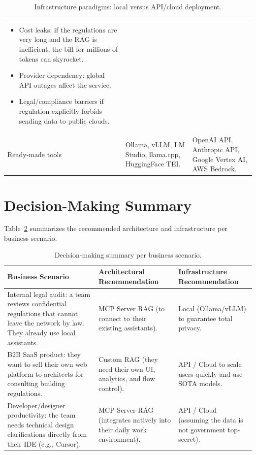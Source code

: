 \documentclass[11pt,a4paper]{article}
\begin{document}
\begin{table}[htbp]
\begin{tabular}{>{\raggedright\arraybackslash}p{2.0cm}>{\raggedright\arraybackslash}p{6.4cm}>{\raggedright\arraybackslash}p{6.4cm}}
\begin{itemize}[leftmargin=1.2em, nosep, topsep=0pt]
  \item Cost leaks: if the regulations are very long and the RAG is inefficient, the bill for millions of tokens can skyrocket.
  \item Provider dependency: global API outages affect the service.
  \item Legal/compliance barriers if regulation explicitly forbids sending data to public clouds.
\end{itemize} \\
Ready-made tools & Ollama, vLLM, LM Studio, llama.cpp, HuggingFace TEI. & OpenAI API, Anthropic API, Google Vertex AI, AWS Bedrock. \\
\bottomrule
\end{tabular}
\endgroup
\caption{Infrastructure paradigms: local versus API/cloud deployment.}
\label{tab:infra}
\end{table}

\section{Decision-Making Summary}
\label{sec:decision}

Table~\ref{tab:decision} summarizes the recommended architecture and
infrastructure per business scenario.

\begin{table}[htbp]
\centering
\begingroup
\footnotesize
\setlength{\tabcolsep}{4pt}
\begin{tabular}{>{\raggedright\arraybackslash}p{4.8cm}>{\raggedright\arraybackslash}p{4.8cm}>{\raggedright\arraybackslash}p{4.8cm}}
\toprule
\textbf{Business Scenario} & \textbf{Architectural Recommendation} & \textbf{Infrastructure Recommendation} \\
\midrule
Internal legal audit: a team reviews confidential regulations that cannot leave the network by law. They already use local assistants. & MCP Server RAG (to connect to their existing assistants). & Local (Ollama/vLLM) to guarantee total privacy. \\
B2B SaaS product: they want to sell their own web platform to architects for consulting building regulations. & Custom RAG (they need their own UI, analytics, and flow control). & API / Cloud to scale users quickly and use SOTA models. \\
Developer/designer productivity: the team needs technical design clarifications directly from their IDE (e.g., Cursor). & MCP Server RAG (integrates natively into their daily work environment). & API / Cloud (assuming the data is not government top-secret). \\
\bottomrule
\end{tabular}
\endgroup
\caption{Decision-making summary per business scenario.}
\label{tab:decision}
\end{table}
\end{document}
